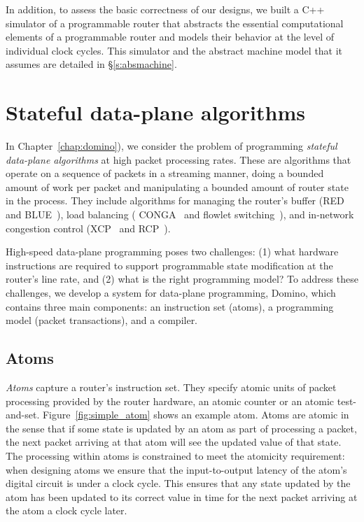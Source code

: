 In addition, to assess the basic correctness of our designs, we built a C++
simulator of a programmable router that abstracts the essential computational
elements of a programmable router and models their behavior at the level of
individual clock cycles. This simulator and the abstract machine model that it
assumes are detailed in \S\ref{s:absmachine}.

\section{Stateful data-plane algorithms}
In Chapter~\ref{chap:domino}), we consider the problem of programming {\em
stateful data-plane algorithms} at high packet processing rates. These are
algorithms that operate on a sequence of packets in a streaming manner, doing
a bounded amount of work per packet and manipulating a bounded amount of router
state in the process.  They include algorithms for managing the router's buffer
(\eg RED~\cite{red} and BLUE~\cite{blue}), load balancing (\eg
CONGA~\cite{conga} and flowlet switching~\cite{flowlets}), and in-network
congestion control (\eg XCP~\cite{xcp} and RCP~\cite{rcp}).

High-speed data-plane programming poses two challenges: (1) what hardware
instructions are required to support programmable state modification at the
router's line rate, and (2) what is the right programming model? To address
these challenges, we develop a system for data-plane programming, Domino, which
contains three main components: an instruction set (atoms), a programming model
(packet transactions), and a compiler.

\subsection{Atoms}
\label{ss:intro_atoms}
\textit{Atoms} capture a router's instruction set. They
specify atomic units of packet processing provided by the router hardware, \eg
an atomic counter or an atomic test-and-set. Figure~\ref{fig:simple_atom} shows
an example atom. Atoms are atomic in the sense that if some state is updated by
an atom as part of processing a packet, the next packet arriving at that atom
will see the updated value of that state. The processing within atoms is
constrained to meet the atomicity requirement: when designing atoms we ensure
that the input-to-output latency of the atom's digital circuit is under a clock
cycle. This ensures that any state updated by the atom has been updated to its
correct value in time for the next packet arriving at the atom a clock cycle
later.

